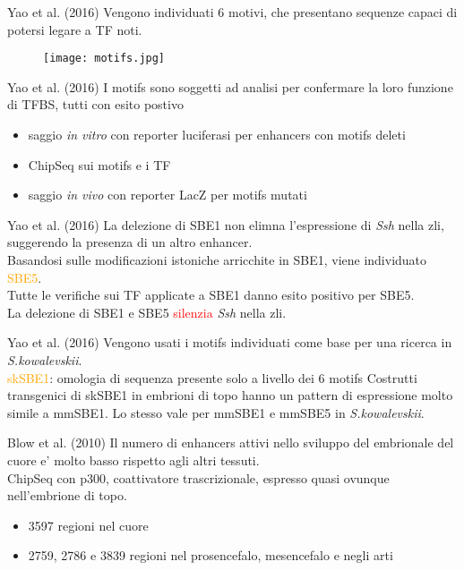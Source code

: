 \documentclass{beamer}
\newcommand{\warn}[1]{\textcolor{red}{#1}}
\begin{document}
    \begin{frame}[plain]{Yao et al. (2016)}
        Vengono individuati 6 motivi, che presentano sequenze capaci di potersi legare a TF noti.\\
        \begin{figure}
            \texttt{[image: motifs.jpg]}
        \end{figure}
    \end{frame}


    \begin{frame}[plain]{Yao et al. (2016)}
        I motifs sono soggetti ad analisi per confermare la loro funzione di TFBS,
        tutti con esito postivo
        \begin{itemize}
            \item saggio \emph{in vitro} con reporter luciferasi per enhancers con motifs deleti
            \item ChipSeq sui motifs e i TF
            \item saggio \emph{in vivo} con reporter LacZ per motifs mutati
        \end{itemize}
    \end{frame}


    \begin{frame}[plain]{Yao et al. (2016)}
        La delezione di SBE1 non elimna l'espressione di \emph{Ssh} nella zli,
        suggerendo la presenza di un altro enhancer.\\
        Basandosi sulle modificazioni istoniche arricchite in SBE1, viene individuato \textcolor{orange}{SBE5}.\\
        Tutte le verifiche sui TF applicate a SBE1 danno esito positivo per SBE5.\\
        La delezione di SBE1 e SBE5 \warn{silenzia} \emph{Ssh} nella zli.
    \end{frame}


    \begin{frame}[plain]{Yao et al. (2016)}
        Vengono usati i motifs individuati come base per una ricerca in \emph{S.kowalevskii}.\\
        \textcolor{orange}{skSBE1}: omologia di sequenza presente solo a livello dei 6 motifs
        Costrutti transgenici di skSBE1 in embrioni di topo hanno un pattern di espressione
        molto simile a mmSBE1. Lo stesso vale per mmSBE1 e mmSBE5 in \emph{S.kowalevskii}.
    \end{frame}


    \begin{frame}[plain]{Blow et al. (2010)}
        Il numero di enhancers attivi nello sviluppo del embrionale del cuore
        e' molto basso rispetto agli altri tessuti.\\
        ChipSeq con p300, coattivatore trascrizionale, espresso quasi
        ovunque nell'embrione di topo.
        \begin{itemize}
            \item 3597 regioni nel cuore
            \item 2759, 2786 e 3839 regioni nel prosencefalo,
            mesencefalo e negli arti
        \end{itemize}
    \end{frame}
\end{document}

